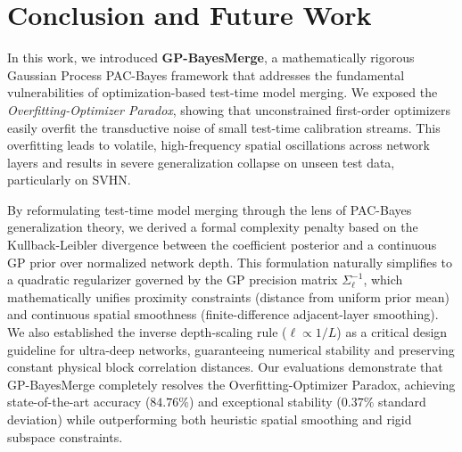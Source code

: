 \section{Conclusion and Future Work}
\label{sec:conclusion}

In this work, we introduced \textbf{GP-BayesMerge}, a mathematically rigorous
Gaussian Process PAC-Bayes framework that addresses the fundamental
vulnerabilities of optimization-based test-time model merging. We exposed the
\emph{Overfitting-Optimizer Paradox}, showing that unconstrained first-order
optimizers easily overfit the transductive noise of small test-time calibration
streams. This overfitting leads to volatile, high-frequency spatial oscillations
across network layers and results in severe generalization collapse on unseen
test data, particularly on SVHN.

By reformulating test-time model merging through the lens of PAC-Bayes
generalization theory, we derived a formal complexity penalty based on the
Kullback-Leibler divergence between the coefficient posterior and a continuous
GP prior over normalized network depth. This formulation naturally simplifies to
a quadratic regularizer governed by the GP precision matrix
$\Sigma_{\ell}^{-1}$, which mathematically unifies proximity constraints
(distance from uniform prior mean) and continuous spatial smoothness
(finite-difference adjacent-layer smoothing). We also established the inverse
depth-scaling rule ($\ell \propto 1/L$) as a critical design guideline for
ultra-deep networks, guaranteeing numerical stability and preserving constant
physical block correlation distances. Our evaluations demonstrate that
GP-BayesMerge completely resolves the Overfitting-Optimizer Paradox, achieving
state-of-the-art accuracy ($84.76\%$) and exceptional stability ($0.37\%$
standard deviation) while outperforming both heuristic spatial smoothing and
rigid subspace constraints.

